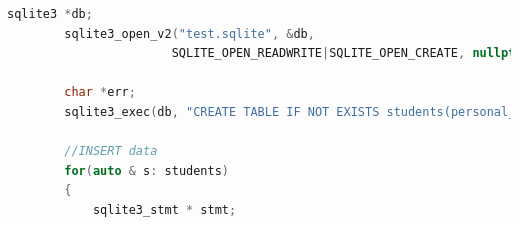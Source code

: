 \documentclass [11pt,a4paper,dvipdfmx] {jarticle}
\begin{document}
\begin{lstlisting}[language=C++]
        sqlite3 *db;                                                                                                                                                                                                                                                                  
        sqlite3_open_v2("test.sqlite", &db,
                       SQLITE_OPEN_READWRITE|SQLITE_OPEN_CREATE, nullptr);                                                                                                                                                                                       
                                                                                                                                                                                                                                                                                    
        char *err;
        sqlite3_exec(db, "CREATE TABLE IF NOT EXISTS students(personal_id INTEGER, name TEXT, height REAL, weight REAL);", nullptr, nullptr, &err);
        
        //INSERT data                                                                                                                                                                                                                                                                 
        for(auto & s: students)                                                                                                                                                                                                                                                       
        {                                                                                                                                                                                                                                                                             
            sqlite3_stmt * stmt;                                                                                                                                                                                                                                                        
                                                                                                                                                                                                                                                                                      

\end{lstlisting}
\end{document}
